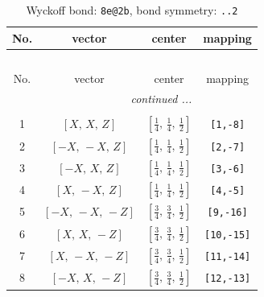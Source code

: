 \documentclass[fleqn,8pt]{jsarticle}
\begin{document}
\begin{longtable}{cccc}
\caption{Wyckoff bond: {\tt 8e@2b}, bond symmetry: {\tt ..2}}
 \\
 \hline \hline
No. & vector & center & mapping \\ \hline \endfirsthead

\multicolumn{3}{l}{\tablename\ \thetable{}} \\
 \hline \hline
No. & vector & center & mapping \\ \hline \endhead

 \hline \hline
\multicolumn{3}{r}{\footnotesize\it continued ...} \\ \endfoot

 \hline \hline
\multicolumn{3}{r}{} \\ \endlastfoot

1 & $\left[ X,\, X,\, Z \right]$ & $\left[ \frac{1}{4},\, \frac{1}{4},\, \frac{1}{2} \right]$ & {\tt [1,-8]} \\ \hline
2 & $\left[ - X,\, - X,\, Z \right]$ & $\left[ \frac{1}{4},\, \frac{1}{4},\, \frac{1}{2} \right]$ & {\tt [2,-7]} \\ \hline
3 & $\left[ - X,\, X,\, Z \right]$ & $\left[ \frac{1}{4},\, \frac{1}{4},\, \frac{1}{2} \right]$ & {\tt [3,-6]} \\ \hline
4 & $\left[ X,\, - X,\, Z \right]$ & $\left[ \frac{1}{4},\, \frac{1}{4},\, \frac{1}{2} \right]$ & {\tt [4,-5]} \\ \hline
5 & $\left[ - X,\, - X,\, - Z \right]$ & $\left[ \frac{3}{4},\, \frac{3}{4},\, \frac{1}{2} \right]$ & {\tt [9,-16]} \\ \hline
6 & $\left[ X,\, X,\, - Z \right]$ & $\left[ \frac{3}{4},\, \frac{3}{4},\, \frac{1}{2} \right]$ & {\tt [10,-15]} \\ \hline
7 & $\left[ X,\, - X,\, - Z \right]$ & $\left[ \frac{3}{4},\, \frac{3}{4},\, \frac{1}{2} \right]$ & {\tt [11,-14]} \\ \hline
8 & $\left[ - X,\, X,\, - Z \right]$ & $\left[ \frac{3}{4},\, \frac{3}{4},\, \frac{1}{2} \right]$ & {\tt [12,-13]} \\
\end{longtable}
\renewcommand{\arraystretch}{1.2}
\end{document}
